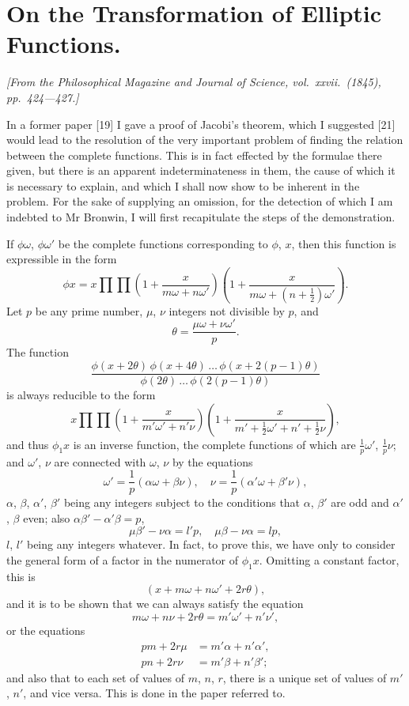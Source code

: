 \documentclass[12pt,a4paper]{article}
\begin{document}
\section*{On the Transformation of Elliptic Functions.}

\textit{[From the Philosophical Magazine and Journal of Science, vol.~xxvii.~(1845),}
\textit{pp.~424---427.]}

\bigskip
\setcounter{page}{132}

In a former paper [19] I gave a proof of Jacobi's theorem, which I suggested [21]
would lead to the resolution of the very important problem of finding the relation
between the complete functions. This is in fact effected by the formulae there given,
but there is an apparent indeterminateness in them, the cause of which it is necessary
to explain, and which I shall now show to be inherent in the problem. For the sake
of supplying an omission, for the detection of which I am indebted to Mr Bronwin,
I will first recapitulate the steps of the demonstration.

If $\phi\omega$, $\phi\omega'$ be the complete functions corresponding to $\phi$, $x$, then this function
is expressible in the form
\[
\phi x = x \prod \prod \left(1 + \frac{x}{m\omega + n\omega'}\right) \left(1 + \frac{x}{m\omega + (n + \frac{1}{2})\omega'}\right).
\]
Let $p$ be any prime number, $\mu$, $\nu$ integers not divisible by $p$, and
\[
\theta = \frac{\mu\omega + \nu\omega'}{p}.
\]
The function
\[
\frac{\phi(x + 2\theta)\, \phi(x + 4\theta)\, \ldots\, \phi(x + 2(p-1)\theta)}{\phi(2\theta)\, \ldots\, \phi(2(p-1)\theta)}
\]
is always reducible to the form
\[
x \prod \prod \left(1 + \frac{x}{m'\omega' + n'\nu}\right) \left(1 + \frac{x}{m' + \frac{1}{2}\omega' + n' + \frac{1}{2}\nu}\right),
\]
and thus $\phi_1 x$ is an inverse function, the complete functions of which are $\frac{1}{p}\omega'$, $\frac{1}{p}\nu$; and
$\omega'$, $\nu$ are connected with $\omega$, $\nu$ by the equations
\[
\omega' = \frac{1}{p}(\alpha\omega + \beta\nu),\quad
\nu = \frac{1}{p}(\alpha'\omega + \beta'\nu),
\]
$\alpha$, $\beta$, $\alpha'$, $\beta'$ being any integers subject to the conditions that $\alpha$, $\beta'$ are odd and $\alpha'$, $\beta$
even; also $\alpha\beta' - \alpha'\beta = p$,
\[
\mu\beta' - \nu\alpha = l'p,\quad
\mu\beta - \nu\alpha = lp,
\]
$l$, $l'$ being any integers whatever. In fact, to prove this, we have only to consider
the general form of a factor in the numerator of $\phi_1 x$. Omitting a constant factor,
this is
\[
(x + m\omega + n\omega' + 2r\theta),
\]
and it is to be shown that we can always satisfy the equation
\[
m\omega + n\nu + 2r\theta = m'\omega' + n'\nu',
\]
or the equations
\begin{align*}
pm + 2r\mu &= m'\alpha + n'\alpha',\\
pn + 2r\nu &= m'\beta + n'\beta';
\end{align*}
and also that to each set of values of $m$, $n$, $r$, there is a unique set of values of
$m'$, $n'$, and vice versa. This is done in the paper referred to.
\end{document}
